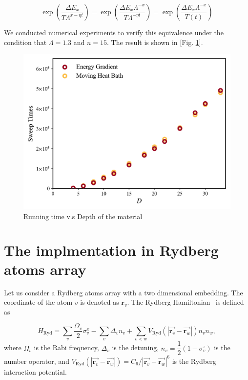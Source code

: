 \documentclass[twocolumn,superscriptaddress,english,showpacs,longbibliography]{revtex4-2}
\begin{document}
\begin{equation}
    \exp\left({\frac{\Delta E_x}{T\Lambda^{x-\eta t}}}\right) = \exp\left({\frac{\Delta E_x\Lambda^{-x}}{T\Lambda^{-\eta t}}}\right) = \exp\left({\frac{\Delta E_x \Lambda^{-x}}{T(t)}}\right)
\end{equation}

We conducted numerical experiments to verify this equivalence under the condition
that $\Lambda = 1.3$ and $n=15$. The result is shown in [Fig. \ref{EGvsMHB}].
\begin{figure}[h]
    \centering
    \includegraphics[width=\columnwidth,keepaspectratio]{../notes/images/EGvsMHB.png}
    \caption{Running time v.s Depth of the material}
    \label{EGvsMHB}
\end{figure}

\section{The implmentation in Rydberg atoms array}\label{physical-model-rydberg-atoms-array}
Let us consider a Rydberg atoms array with a two dimensional embedding. The coordinate of the atom $v$ is denoted as $\mathbf{r}_v$.
The Rydberg Hamiltonian~\cite{Nguyen2023} is defined as

\begin{equation}
    H_{\text{Ryd}} = \sum_v \dfrac{\Omega_v}{2} \sigma^x_v -\sum_v \Delta_v n_v + \sum_{v < w}  V_{\text{Ryd}}(|\overrightarrow{\mathbf{r}_v} -\overrightarrow{\mathbf{r}_w}|)n_v n_w,
\end{equation}
where $\Omega_v$ is the Rabi frequency, $\Delta_v$ is the detuning,
$n_v = \dfrac{1}{2}(1 - \sigma^z_v)$ is the number operator, and
$V_{\text{Ryd}}(|\overrightarrow{\mathbf{r}_v} - \overrightarrow{\mathbf{r}_w}|) = C_6/|\overrightarrow{\mathbf{r}_v} - \overrightarrow{\mathbf{r}_w}|^6$
is the Rydberg interaction potential.
\end{document}
